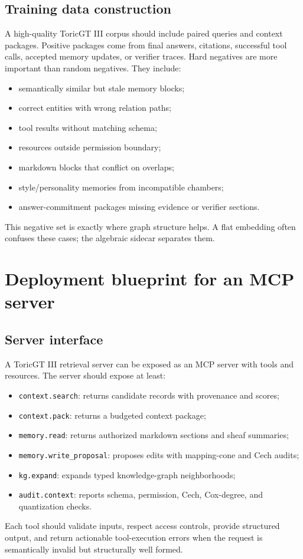 \documentclass[11pt]{article}
\numberwithin{equation}{section}
\begin{document}
\subsection{Training data construction}
A high-quality ToricGT III corpus should include paired queries and context packages. Positive packages come from final answers, citations, successful tool calls, accepted memory updates, or verifier traces. Hard negatives are more important than random negatives. They include:
\begin{itemize}
\item semantically similar but stale memory blocks;
\item correct entities with wrong relation paths;
\item tool results without matching schema;
\item resources outside permission boundary;
\item markdown blocks that conflict on overlaps;
\item style/personality memories from incompatible chambers;
\item answer-commitment packages missing evidence or verifier sections.
\end{itemize}
This negative set is exactly where graph structure helps. A flat embedding often confuses these cases; the algebraic sidecar separates them.

\section{Deployment blueprint for an MCP server}
\subsection{Server interface}
A ToricGT III retrieval server can be exposed as an MCP server with tools and resources. The server should expose at least:
\begin{itemize}
\item \texttt{context.search}: returns candidate records with provenance and scores;
\item \texttt{context.pack}: returns a budgeted context package;
\item \texttt{memory.read}: returns authorized markdown sections and sheaf summaries;
\item \texttt{memory.write\_proposal}: proposes edits with mapping-cone and Cech audits;
\item \texttt{kg.expand}: expands typed knowledge-graph neighborhoods;
\item \texttt{audit.context}: reports schema, permission, Cech, Cox-degree, and quantization checks.
\end{itemize}
Each tool should validate inputs, respect access controls, provide structured output, and return actionable tool-execution errors when the request is semantically invalid but structurally well formed.
\end{document}
